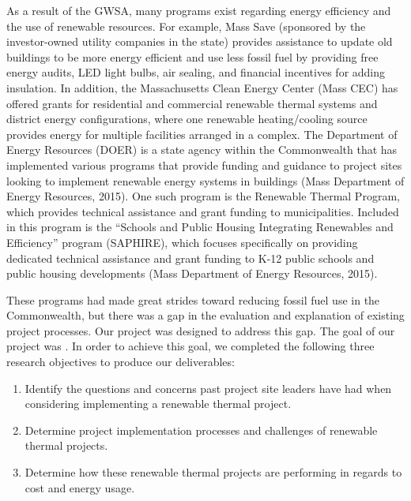 \par As a result of the GWSA, many programs exist regarding energy efficiency and the use of renewable resources. For example, Mass Save (sponsored by the investor-owned utility companies in the state) provides assistance to update old buildings to be more energy efficient and use less fossil fuel by providing free energy audits, LED light bulbs, air sealing, and financial incentives for adding insulation. In addition, the Massachusetts Clean Energy Center (Mass CEC) has offered grants for residential and commercial renewable thermal systems and district energy configurations, where one renewable heating/cooling source provides energy for multiple facilities arranged in a complex. The Department of Energy Resources (DOER) is a state agency within the Commonwealth that has implemented various programs that provide funding and guidance to project sites looking to implement renewable energy systems in buildings (Mass Department of Energy Resources, 2015). One such program is the Renewable Thermal Program, which provides technical assistance and grant funding to municipalities. Included in this program is the “Schools and Public Housing Integrating Renewables and Efficiency” program (SAPHIRE), which focuses specifically on providing dedicated technical assistance and grant funding to K-12 public schools and public housing developments (Mass Department of Energy Resources, 2015).
\par These programs had made great strides toward reducing fossil fuel use in the Commonwealth, but there was a gap in the evaluation and explanation of existing project processes. Our project was designed to address this gap. The goal of our project was \goal. In order to achieve this goal, we completed the following three research objectives to produce our deliverables:
\begin{enumerate}
  \item{Identify the questions and concerns past project site leaders have had when considering implementing a renewable thermal project.}
  \item{Determine project implementation processes and challenges of renewable thermal projects.}
  \item{Determine how these renewable thermal projects are performing in regards to cost and energy usage.}
\end{enumerate}

